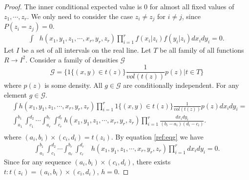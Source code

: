 \documentclass{article}
\begin{document}
\begin{proof}
The inner conditional expected value is 0 for almost all fixed values of $z_1, \cdots,z_r$. We only need to consider  the case   $z_i\neq z_j$ for $i\neq j$, since $P(z_i= z_j)=0$. 
\begin{align}
\label{ref:eqg}
 \int &h(x_1,y_1,z_1, \cdots, x_r,y_r,z_r)  \prod_{i=1}^{r} f(x_i|z_i)f(y_i|z_i) dx_i dy_i = 0.
\end{align}
Let $I$ be a set of all intervals on the real line. Let  $T$ be all family of all functions $R \to I^2$. Consider a family of densities $\mathcal G$
\[
 \mathcal G = \bigg \{ 1\{ (x,y) \in t(z) \}  \frac{1}{vol(t(z))} p(z) | t \in T \bigg \}
\]
where $p(z)$ is some density. All $g \in \mathcal G$ are conditionally independent. For any element $g \in \mathcal G$.
\begin{align}
&\int h(x_1,y_1,z_1, \cdots, x_r,y_r,z_r) \prod_{i=1}^{r} 1\{ (x,y) \in t(z) \}  \frac{1}{vol(t(z))} p(z)dx_i dy_i =\\ 
&\int_{a_1}^{b_1} \int_{c_1}^{d_2} \cdots \int_{a_r}^{b_r} \int_{c_r}^{d_r} h(x_1,y_1,z_1, \cdots, x_r,y_r,z_r) \prod_{i=1}^{r}  \frac{dx_i dy_i}{(b_i - a_i)(d_i-c_i) }. \\   
\end{align}
where $(a_i,b_i) \times (c_i,d_i) = t(z_i)$. 
By equation \ref{ref:eqg} we have 
\begin{align}
 \int_{a_1}^{b_1} \int_{c_1}^{d_2} \cdots \int_{a_r}^{b_r} \int_{c_r}^{d_r}& h(x_1,y_1,z_1, \cdots, x_r,y_r,z_r) \prod_{i=1}^{r}  dx_i dy_i = 0.
\end{align}
Since for any  sequence $ (a_i,b_i)\times (c_i,d_i) $, there exists  $t: t(z_i) = (a_i,b_i)\times (c_i,d_i) $, $h=0$. 
\end{proof}

% 
\end{document}
